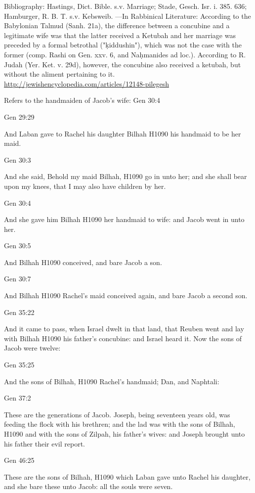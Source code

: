 \documentclass[11pt]{article}
\begin{document}
Bibliography:
Hastings, Dict. Bible. s.v. Marriage;
Stade, Gesch. Isr. i. 385. 636;
Hamburger, R. B. T. s.v. Kebsweib.
—In Rabbinical Literature:
According to the Babylonian Talmud (Sanh. 21a), the difference between a concubine and a legitimate wife was that the latter received a Ketubah and her marriage was preceded by a formal betrothal ("ḳiddushin"), which was not the case with the former (comp. Rashi on Gen. xxv. 6, and Naḥmanides ad loc.). According to R. Judah (Yer. Ket. v. 29d), however, the concubine also received a ketubah, but without the aliment pertaining to it.
\url{http://jewishencyclopedia.com/articles/12148-pilegesh}

Refers to the handmaiden of Jacob's wife:
Gen 30:4



Gen 29:29

And Laban gave to Rachel his daughter Bilhah H1090 his handmaid to be her maid.


Gen 30:3

And she said, Behold my maid Bilhah, H1090 go in unto her; and she shall bear upon my knees, that I may also have children by her.


Gen 30:4

And she gave him Bilhah H1090 her handmaid to wife: and Jacob went in unto her.


Gen 30:5

And Bilhah H1090 conceived, and bare Jacob a son.


Gen 30:7

And Bilhah H1090 Rachel's maid conceived again, and bare Jacob a second son.


Gen 35:22

And it came to pass, when Israel dwelt in that land, that Reuben went and lay with Bilhah H1090 his father's concubine: and Israel heard it. Now the sons of Jacob were twelve:


Gen 35:25

And the sons of Bilhah, H1090 Rachel's handmaid; Dan, and Naphtali:



Gen 37:2

These are the generations of Jacob. Joseph, being seventeen years old, was feeding the flock with his brethren; and the lad was with the sons of Bilhah, H1090 and with the sons of Zilpah, his father's wives: and Joseph brought unto his father their evil report.


Gen 46:25

These are the sons of Bilhah, H1090 which Laban gave unto Rachel his daughter, and she bare these unto Jacob: all the souls were seven.
\end{document}
